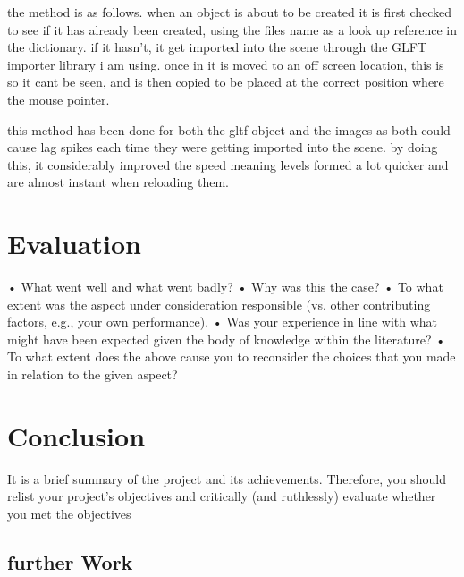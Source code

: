 the method is as follows. when an object is about to be created it is first checked to see if it has already been created, using the files name as a look up reference in the dictionary. if it hasn't, it get imported into the scene through the GLFT importer library i am using. once in it is moved to an off screen location, this is so it cant be seen, and is then copied to be placed at the correct position where the mouse pointer.

this method has been done for both the gltf object and the images as both could cause lag spikes each time they were getting imported into the scene. by doing this, it considerably improved the speed meaning levels formed a lot quicker and are almost instant when reloading them. 

\section{Evaluation}
•	What went well and what went badly?  
•	Why was this the case?  
•	To what extent was the aspect under consideration responsible (vs. other contributing factors, e.g., your own performance).
•	Was your experience in line with what might have been expected given the body of knowledge within the literature?
•	To what extent does the above cause you to reconsider the choices that you made in relation to the given aspect?

\section{Conclusion}
It is a brief summary of the project and its achievements. Therefore, you should relist your project’s objectives and critically (and ruthlessly) evaluate whether you met the objectives
\subsection{further Work}

